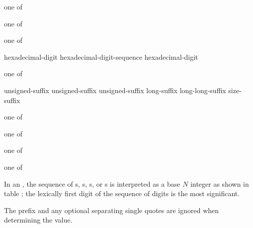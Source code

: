 \begin{bnf}
 \textnormal{one of}\br
\end{bnf}

\begin{bnf}
 \textnormal{one of}\br
\end{bnf}

\begin{bnf}
 \textnormal{one of}\br
\end{bnf}

\begin{bnf}
\br
    hexadecimal-digit\br
    hexadecimal-digit-sequence  hexadecimal-digit
\end{bnf}

\begin{bnf}
 \textnormal{one of}\br
    \br
    \br
\end{bnf}

\begin{bnf}
\br
    unsigned-suffix  \br
    unsigned-suffix  \br
    unsigned-suffix  \br
    long-suffix  \br
    long-long-suffix  \br
    size-suffix 
\end{bnf}

\begin{bnf}
 \textnormal{one of}\br
\end{bnf}

\begin{bnf}
 \textnormal{one of}\br
\end{bnf}

\begin{bnf}
 \textnormal{one of}\br
\end{bnf}

\begin{bnf}
 \textnormal{one of}\br
\end{bnf}

\pnum
{}%
%
%
In an ,
the sequence of
s,
s,
s, or
s
is interpreted as a base $N$ integer as shown in table ;
the lexically first digit of the sequence of digits is the most significant.
\begin{note}
The prefix and any optional separating single quotes are ignored
when determining the value.
\end{note}

